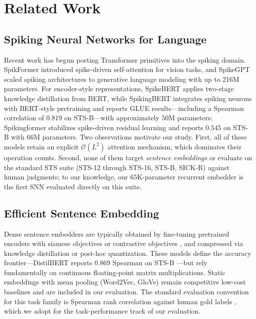 \documentclass[10pt,journal,compsoc]{IEEEtran}
\begin{document}
\section{Related Work}

\subsection{Spiking Neural Networks for Language}
Recent work has begun porting Transformer primitives into the spiking domain. SpikFormer \cite{zhou2023spikformer} introduced spike-driven self-attention for vision tasks, and SpikeGPT \cite{zhu2023spikegpt} scaled spiking architectures to generative language modeling with up to 216M parameters. For encoder-style representations, SpikeBERT \cite{lv2023spikebert} applies two-stage knowledge distillation from BERT, while SpikingBERT \cite{bal2024spikingbert} integrates spiking neurons with BERT-style pretraining and reports GLUE results---including a Spearman correlation of $0.819$ on STS-B---with approximately $50$M parameters; Spikingformer \cite{zhou2025spikingformer} stabilizes spike-driven residual learning and reports $0.545$ on STS-B with $66$M parameters. Two observations motivate our study. First, all of these models retain an explicit $\mathcal{O}(L^2)$ attention mechanism, which dominates their operation counts. Second, none of them target \emph{sentence embeddings} or evaluate on the standard STS suite (STS-12 through STS-16, STS-B, SICK-R) against human judgments; to our knowledge, our $65$K-parameter recurrent embedder is the first SNN evaluated directly on this suite.

\subsection{Efficient Sentence Embedding}
Dense sentence embedders are typically obtained by fine-tuning pretrained encoders with siamese objectives \cite{reimers2019sentence} or contrastive objectives \cite{gao2021simcse}, and compressed via knowledge distillation \cite{hinton2015distilling, sanh2019distilbert, wang2020minilm} or post-hoc quantization. These models define the accuracy frontier---DistilBERT reports $0.869$ Spearman on STS-B \cite{sanh2019distilbert}---but rely fundamentally on continuous floating-point matrix multiplications. Static embeddings with mean pooling (Word2Vec, GloVe) remain competitive low-cost baselines and are included in our evaluation. The standard evaluation convention for this task family is Spearman rank correlation against human gold labels \cite{muennighoff2022mteb, cer2017semeval}, which we adopt for the task-performance track of our evaluation.
\end{document}
